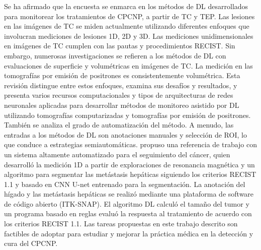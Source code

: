 \documentclass[11pt,a4paper,openany]{article}
\begin{document}
    Se ha afirmado que la encuesta se enmarca en los métodos de DL desarrollados para monitorear los tratamientos de CPCNP, a partir de TC y TEP. Las lesiones en las imágenes de TC se miden actualmente utilizando diferentes enfoques que involucran mediciones de lesiones 1D, 2D y 3D. Las mediciones unidimensionales en imágenes de TC cumplen con las pautas y procedimientos RECIST. Sin embargo, numerosas investigaciones se refieren a los métodos de DL con evaluaciones de superficie y volumétricas en imágenes de TC. La medición en las tomografías por emisión de positrones es consistentemente volumétrica. Esta revisión distingue entre estos enfoques, examina sus desafíos y resultados, y presenta varios recursos computacionales y tipos de arquitecturas de redes neuronales aplicadas para desarrollar métodos de monitoreo asistido por DL utilizando tomografías computarizadas y tomografías por emisión de positrones. También se analiza el grado de automatización del método. A menudo, las entradas a los métodos de DL son anotaciones manuales y selección de ROI, lo que conduce a estrategias semiautomáticas. \cite{Liu2022} propuso una referencia de trabajo con un sistema altamente automatizado para el seguimiento del cáncer, quien desarrolló la medición 1D a partir de exploraciones de resonancia magnética y un algoritmo para segmentar las metástasis hepáticas siguiendo los criterios RECIST 1.1 y basado en CNN U-net entrenado para la segmentación. La anotación del hígado y las metástasis hepáticas se realizó mediante una plataforma de software de código abierto (ITK-SNAP). El algoritmo DL calculó el tamaño del tumor y un programa basado en reglas evaluó la respuesta al tratamiento de acuerdo con los criterios RECIST 1.1. Las tareas propuestas en este trabajo descrito son factibles de adoptar para estudiar y mejorar la práctica médica en la detección y cura del CPCNP.
\end{document}
